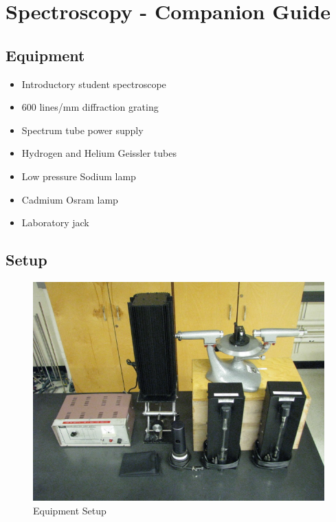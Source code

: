 \documentclass[justified]{tufte-book}
\begin{document}
\chapter{Spectroscopy - Companion Guide}



\section{Equipment}

\begin{minipage}[t]{0.6\textwidth}
\begin{itemize}[noitemsep]
\item Introductory student spectroscope
\item 600 lines/mm diffraction grating
\item Spectrum tube power supply
\item Hydrogen and Helium Geissler tubes 
\end{itemize}
\end{minipage}
\begin{minipage}[t]{0.4\textwidth}
\begin{itemize}[noitemsep]
\item Low pressure Sodium lamp
\item Cadmium Osram lamp
\item Laboratory jack
\end{itemize}
\end{minipage}

\section{Setup}
\begin{figure}
\includegraphics{Spectroscopy-Setup.jpg}
\caption{Equipment Setup}
\label{pic:SPsetup}
\end{figure}
\end{document}
